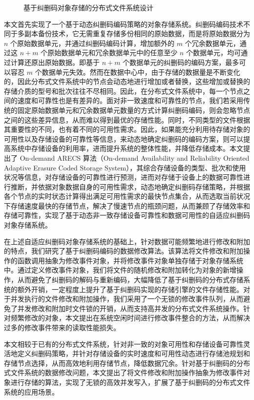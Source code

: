 \begin{figure}[!htb]
\centering
\resizebox{.8\textwidth}{!}{}
\caption{基于纠删码对象存储的分布式文件系统设计}
\label{p2}
\end{figure}

本文首先实现了一个基于动态纠删码编码策略的对象存储系统。纠删码编码技术不同于多副本备份技术，它无需重复存储多份相同的原始数据，而是将原始数据分为 $n$ 个原始数据单元，并通过纠删码编码计算，增加额外的 $m$ 个冗余数据单元，通过这 $n+m$ 个原始数据单元和冗余数据单元中的任意至少 $n$ 个数据单元，均可通过计算还原出原始数据。即基于 $n+m$ 个数据单元的纠删码的编码方案，最多可以容忍 $m$ 个数据单元失效。然而在数据中心中，由于存储的数据量是不断变化的，因此分布式文件系统中的节点会动态地进行增加或者替换，这些增加或替换的存储介质的型号和批次往往不尽相同。因此，在分布式文件系统中，每一个节点之间的速度和可靠性也是有差异的。面对非一致速度和可靠性的节点，我们若采用传统的固定原始数据单元和冗余数据单元数量的方式计算纠删码编码，则会忽略节点之间的这些差异信息，从而难以得到最优的存储性能。同时，不同类型的文件根据其重要性的不同，也有着不同的可用性需求。因此，如果能充分利用待存储对象的可用性以及存储设备的可靠性等信息，来动态地确定纠删码的编码方案，则可以提高系统中存储设备的利用率，进而提升系统的整体性能，并降低存储成本。本文提出了 On-demand ARECS 算法（On-demand Availability and Reliability Oriented Adaptive Erasure Coded Storage System），其综合存储设备的类型、批次和使用状况等信息，对存储设备的可靠性进行预测，进而对存储于设备上的数据可靠性进行推断，并依据对象数据自身的可用性需求，动态地确定纠删码存储策略，并根据各个节点的实时状态计算得出满足可用性需求的最快节点集合，从而选取当前状况下存储速度最快的存储节点，解决了慢速节点的瓶颈问题，从而兼顾了存储效率和存储可靠性，实现了基于动态非一致存储设备可靠性和数据可用性的自适应纠删码对象存储系统。

在上述自适应纠删码对象存储系统的基础上，针对数据可能频繁地进行修改和附加的特点，我们研究了基于纠删码编码的数据修改算法。该算法将文件修改和附加操作的函数调用抽象为修改事件对象，并将修改事件对象单独存储于对象存储系统中。通过定义修改事件对象，我们将文件的随机修改和附加转化为对象的新增操作，从而避免了纠删码的解码与重新编码，大幅降低了基于纠删码的分布式存储系统的额外开销，一定程度上提升了基于纠删码实现的存储引擎的文件存储性能。对于并发执行的文件修改和附加操作，我们采用了一个无锁的修改事件队列，从而避免了并发修改和附加时文件锁的开销，从而支持高并发的分布式文件系统操作。针对频繁修改的对象，本文提出在系统空闲时间进行修改事件整合的方法，从而解决过多的修改事件带来的读取性能损失。

本文相较于已有的分布式文件系统，针对非一致的对象可用性和存储设备可靠性灵活地定义纠删码策略，并针对存储设备的实时速度和可用性动态进行存储池规划和存储节点选择，从而高效地利用存储节点，降低数据冗余。针对基于纠删码的分布式文件系统的数据修改问题，本文提出了将文件修改和附加操作抽象为修改事件对象进行存储的算法，实现了无锁的高效并发写入，扩展了基于纠删码的分布式文件系统的应用场景。

